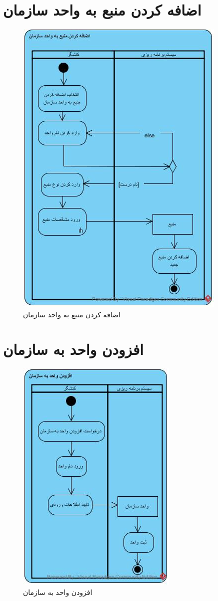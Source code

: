 \section{اضافه کردن منبع به واحد سازمان}
\begin{figure}[H]
	\centering
	\includegraphics[scale=0.8]{img/activity/AddResourceToUnit}
	\caption{اضافه کردن منبع به واحد سازمان}
\end{figure}

\section{افزودن واحد به سازمان}
\begin{figure}[H]
	\centering
	\includegraphics[scale=1]{img/activity/AddUnitToOrganization}
	\caption{افزودن واحد به سازمان}
\end{figure}


